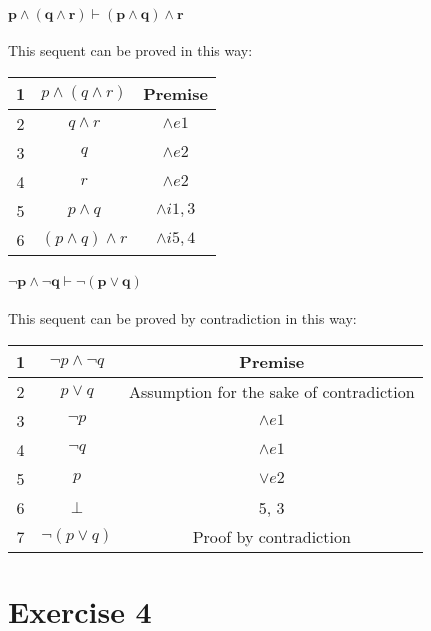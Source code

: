 \documentclass[11pt]{exam}
\begin{document}
\paragraph*{\(\bm{p \wedge (q \wedge r) \vdash (p \wedge q) \wedge r}\)}
This sequent can be proved in this way:
\begin{center}
    \begin{tabular}{c c c}
        1 & \(p \wedge (q \wedge r)\) & Premise \\   
        \hline
        2 & \(q \wedge r\) & \(\wedge e1\) \\
        3 & \(q\) & \(\wedge e2\) \\
        4 & \(r\) & \(\wedge e2\) \\
        5 & \(p \wedge q\) & \(\wedge i1,3\) \\
        6 & \((p \wedge q) \wedge r\) & \(\wedge i5,4\) \\
    \end{tabular}
\end{center}
\paragraph*{\(\bm{\neg p \wedge \neg q \vdash \neg(p \vee q)}\)}
This sequent can be proved by contradiction in this way:
\begin{center}
    \begin{tabular}{c c c}
        1 & \(\neg p \wedge \neg q\) & Premise \\
        \hline
        2 & \(p \vee q\) & Assumption for the sake of contradiction \\
        3 & \(\neg p\) & \(\wedge e1\) \\
        4 & \(\neg q\) & \(\wedge e1\) \\
        5 & \(p\) & \(\vee e2\) \\
        6 & \(\bot\) & 5, 3 \\
        7 & \(\neg(p \vee q)\) & Proof by contradiction \\
    \end{tabular}
\end{center}
\section*{Exercise 4}
\end{document}

